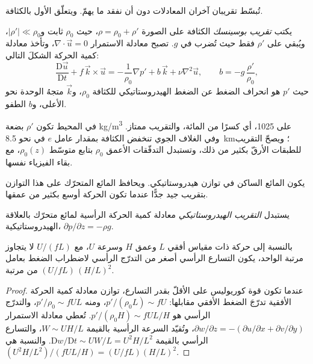 
تُبسّط تقريبان آخران المعادلات دون أن نفقد ما
يهمّ. ويتعلّق الأول بالكثافة.

\begin{definition}\label{def:b3:gfd-foundations:boussinesq}
يكتب \emph{تقريب بوسينسك} الكثافة
على الصورة $\rho = \rho_0 + \rho'$، حيث $\rho_0$ ثابت
و$|\rho'| \ll \rho_0$، ويُبقي على $\rho'$ فقط حيث تُضرب في $g$.
تصبح معادلة الاستمرار $\nabla\cdot\vec u = 0$، وتأخذ معادلة
كمية الحركة الشكلَ التالي:
\[
\frac{\mathrm D\vec u}{\mathrm Dt} + f\,\vec k\times\vec u =
-\frac{1}{\rho_0}\nabla p' + b\,\vec k + \nu\nabla^2\vec u ,
\qquad b = -g\,\frac{\rho'}{\rho_0} ,
\]
حيث $p'$ هو انحراف الضغط عن الضغط
الهيدروستاتيكي للكثافة $\rho_0$، و$\vec k$ متجهُ الوحدة نحو الأعلى، و$b$
الطفو.
\end{definition}

في المحيط تكون $\rho'$ بضعة \unit{kg/m^3} على \num{1025}، أي كسرًا من
المائة، والتقريب ممتاز. وفي الغلاف الجوي تنخفض الكثافة
بمقدار عامل $e$ في نحو \qty{8.5}{km}؛ ويصحّ التقريب للطبقات
الأرقّ بكثير من ذلك، وتستبدل التدفّقات الأعمق $\rho_0$ بتابع
متوسّط $\rho_0(z)$، مع بقاء الفيزياء نفسها.

يكون المائع الساكن في توازن هيدروستاتيكي. ويحافظ المائع المتحرّك على هذا التوازن
بتقريب جيد جدًّا عندما تكون الحركة
أوسع بكثير من عمقها.

\begin{definition}\label{def:b3:gfd-foundations:hydrostatic}
يستبدل \emph{التقريب الهيدروستاتيكي}
معادلة كمية الحركة الرأسية لمائع متحرّك بالعلاقة
الهيدروستاتيكية، $\partial p/\partial z = -\rho g$.
\end{definition}

\begin{proposition}\label{prop:b3:gfd-foundations:hydrostatic}
بالنسبة إلى حركة ذات مقياس أفقي $L$ وعمق $H$ وسرعة $U$، مع  $U/(fL)$ لا يتجاوز مرتبة الواحد، يكون التسارع الرأسي
أصغر من التدرّج الرأسي لاضطراب الضغط بعامل
من مرتبة $(U/fL)\,(H/L)^2$.
\end{proposition}

\begin{proof}
عندما تكون قوة كوريوليس على الأقلّ بقدر التسارع، توازن
معادلة كمية الحركة الأفقية تدرّجَ الضغط الأفقي مقابلها:
$p'/(\rho_0 L) \sim fU$، ومنه $p'/\rho_0 \sim fUL$، والتدرّج الرأسي
هو $p'/(\rho_0 H) \sim fUL/H$. تُعطي معادلة الاستمرار $\partial w/\partial z
= -(\partial u/\partial x + \partial v/\partial y)$، وتُقيّد السرعة الرأسية
بالقيمة $W \sim UH/L$، والتسارع الرأسي بالقيمة
$\mathrm Dw/\mathrm Dt \sim UW/L = U^2H/L^2$. والنسبة هي $(U^2H/L^2)/(fUL/H)
= (U/fL)(H/L)^2$.
\end{proof}

